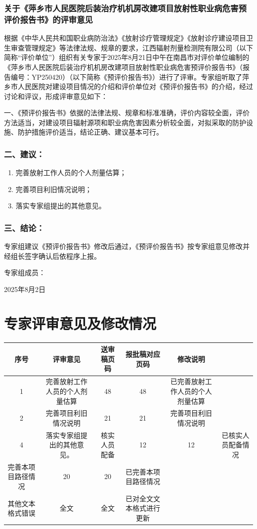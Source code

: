 \subsubsection{关于《萍乡市人民医院后装治疗机机房改建项目放射性职业病危害预评价报告书》的评审意见}

根据《中华人民共和国职业病防治法》《放射诊疗管理规定》《放射诊疗建设项目卫生审查管理规定》等法律法规、规章的要求，江西辐射剂量检测院有限公司（以下简称“评价单位”）组织有关专家于2025年8月21日中午在南昌市对评价单位编制的《萍乡市人民医院后装治疗机机房改建项目放射性职业病危害预评价报告书》（报告编号：YP250420）（以下简称《预评价报告书》）进行了评审。专家组听取了萍乡市人民医院对建设项目情况的介绍和评价单位对《预评价报告书》的介绍，经过讨论和评议，形成评审意见如下：

一、《预评价报告书》依据的法律法规、规章和标准准确，评价内容较全面，评价方法适当，对建设项目辐射源项和职业病危害因素分析较全面，对拟采取的防护设施、防护措施评价适当，结论正确、建议基本可行。

\subsubsection{二、建议：}

\begin{enumerate}
\item 完善放射工作人员的个人剂量估算；
\item 完善项目利旧情况说明；
\item 落实专家组提出的其他意见。
\end{enumerate}

\subsubsection{三、结论：}

专家组建议《预评价报告书》修改后通过，《预评价报告书》按专家组意见修改并经组长签字确认后依程序上报。

专家组成员：

2025年8月2日

\section{专家评审意见及修改情况}

\begin{table}[H]
\centering
\begin{tabular}{|c|c|c|c|c|c|}
\hline
序号 & 评审意见 & 送审稿页码 & 报批稿对应页码 & 修改说明 &  \\
\hline
1 & 完善放射工作人员的个人剂量估算 & 48 & 48 & 已完善放射工作人员的个人剂量估算 &  \\
\hline
2 & 完善项目利旧情况说明 & 21 & 21 & 完善项目利旧情况说明 &  \\
\hline
4 & 落实专家组提出的其他意见。 & 核实人员配备 & 12 & 12 & 已核实人员配备情况 \\
\hline
完善本项目路径情况 & 20 & 20 & 已完善本项目路径情况 &  &  \\
\hline
其他文本格式错误 & 全文 & 全文 & 已对全文文本格式进行更新 &  &  \\
\hline
\end{tabular}
\end{table}
